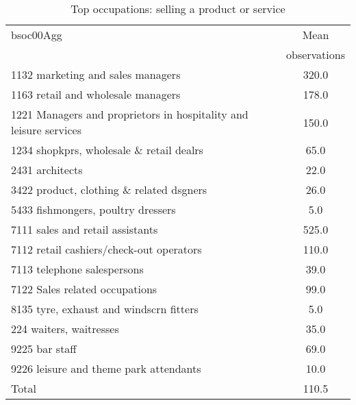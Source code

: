 \begin{table}
	\centering
	\caption{Top occupations: selling a product or service}
	\begin{tabular}{lc}
	\toprule	
		
bsoc00Agg&Mean \\
&observations \\
\hline
1132 marketing and sales managers&320.0 \\
1163 retail and wholesale managers&178.0 \\
1221 Managers and proprietors in hospitality and leisure services&150.0 \\
1234 shopkprs, wholesale \& retail dealrs&65.0 \\
2431 architects&22.0 \\
3422 product, clothing \& related dsgners&26.0 \\
5433 fishmongers, poultry dressers&5.0 \\
7111 sales and retail assistants&525.0 \\
7112 retail cashiers/check-out operators&110.0 \\
7113 telephone salespersons&39.0 \\
7122 Sales related occupations&99.0 \\
8135 tyre, exhaust and windscrn fitters&5.0 \\
224 waiters, waitresses&35.0 \\
9225 bar staff&69.0 \\
9226 leisure and theme park attendants&10.0 \\
Total&110.5 \\
\bottomrule
\bottomrule
\end{tabular}
\end{table}
